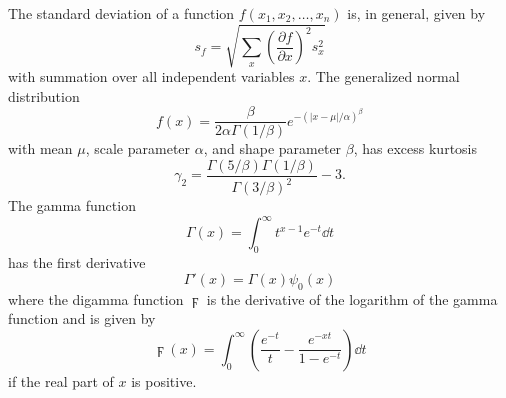 The standard deviation of a function $f(x_{1},x_{2},\dots,x_{n})$ is, in general, given by
\begin{equation} \label{eq:general_stdev}
	s_{f} = \sqrt{\sum_{x} \left( \frac{\partial f}{\partial x} \right)^{2} s_{x}^{2}}
\end{equation}
with summation over all independent variables $x$.  The generalized normal distribution
\begin{equation} \label{eq:generalized_normal}
	f(x) = \frac{\beta}{2 \alpha \Gamma(1/\beta)} e^{-(|x - \mu| / \alpha)^{\beta}}
\end{equation}
with mean $\mu$, scale parameter $\alpha$, and shape parameter $\beta$, has excess kurtosis
\begin{equation} \label{eq:kurtosis}
	\gamma_{2} = \frac{\Gamma(5/\beta) \Gamma(1/\beta)}{\Gamma(3/\beta)^{2}} - 3.
\end{equation}
The gamma function
\begin{equation} \label{eq:gamma_function}
	\Gamma(x) = \int_{0}^{\infty} t^{x-1} e^{-t} \dd t
\end{equation}
has the first derivative
\begin{equation} \label{eq:gamma_prime}
	\Gamma'(x) = \Gamma(x) \psi_{0}(x)
\end{equation}
where the digamma function $\digamma$ is the derivative of the logarithm of the gamma function and is given by
\begin{equation} \label{eq:digamma}
	\digamma(x) = \int_{0}^{\infty} \left( \frac{e^{-t}}{t} - \frac{e^{-xt}}{1 - e^{-t}} \right) \dd t
\end{equation}
if the real part of $x$ is positive.

